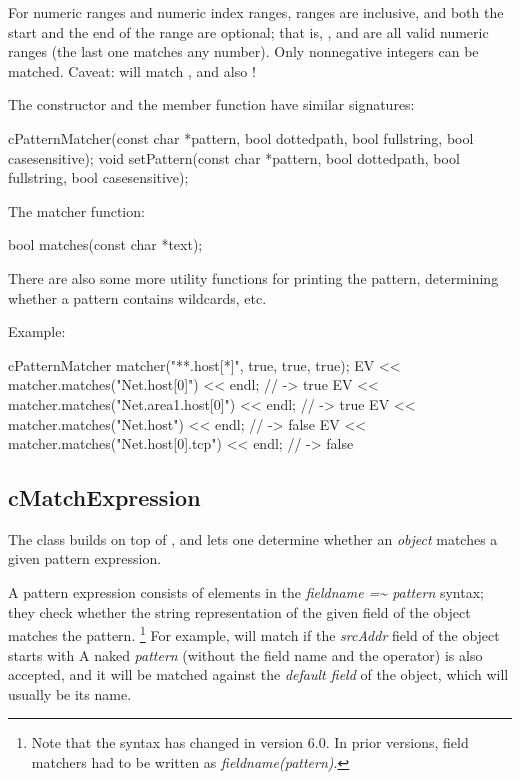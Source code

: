 For numeric ranges and numeric index ranges, ranges are inclusive, and both
the start and the end of the range are optional; that is, ,
 and  are all valid numeric ranges (the last one
matches any number). Only nonnegative integers can be matched. Caveat:
 will match ,  and also !

The  constructor and the  member
function have similar signatures:

\begin{cpp}
cPatternMatcher(const char *pattern, bool dottedpath, bool fullstring,
                bool casesensitive);
void setPattern(const char *pattern, bool dottedpath, bool fullstring,
                bool casesensitive);
\end{cpp}

The matcher function:

\begin{cpp}
bool matches(const char *text);
\end{cpp}

There are also some more utility functions for printing the pattern,
determining whether a pattern contains wildcards, etc.

Example:

\begin{cpp}
cPatternMatcher matcher("**.host[*]", true, true, true);
EV << matcher.matches("Net.host[0]") << endl;  // -> true
EV << matcher.matches("Net.area1.host[0]") << endl;  // -> true
EV << matcher.matches("Net.host") << endl;  // -> false
EV << matcher.matches("Net.host[0].tcp") << endl;  // -> false
\end{cpp}


\subsection{cMatchExpression}
\label{sec:sim-lib:cmatchexpression}

The  class builds on top of ,
and lets one determine whether an \textit{object} matches a given pattern
expression.

A pattern expression consists of elements in the
\textit{fieldname ={\textasciitilde} pattern} syntax; they check whether the string
representation of the given field of the object matches the pattern.
\footnote{Note that the syntax has changed in {\opp} version 6.0. In prior
versions, field matchers had to be written as \textit{fieldname(pattern)}.}
For example,  will match if the \textit{srcAddr}
field of the object starts with  A naked \textit{pattern}
(without the field name and the \ttt{={\textasciitilde}} operator) is also accepted,
and it will be matched against the \textit{default field} of the object,
which will usually be its name.

